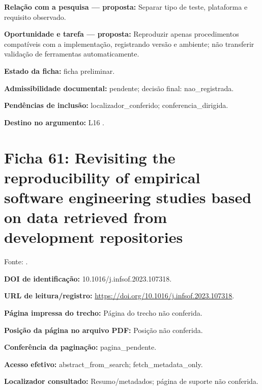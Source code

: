 \noindent\textbf{Relação com a pesquisa — proposta:} Separar tipo de teste, plataforma e requisito observado.\par\medskip

\noindent\textbf{Oportunidade e tarefa — proposta:} Reproduzir apenas procedimentos compatíveis com a implementação, registrando versão e ambiente; não transferir validação de ferramentas automaticamente.\par\medskip

\noindent\textbf{Estado da ficha:} ficha preliminar.\par\medskip

\noindent\textbf{Admissibilidade documental:} pendente; decisão final: nao\_registrada.\par\medskip

\noindent\textbf{Pendências de inclusão:} localizador\_conferido; conferencia\_dirigida.\par\medskip

\noindent\textbf{Destino no argumento:} L16 .

\clearpage\section*{Ficha 61: Revisiting the reproducibility of empirical software engineering studies based on data retrieved from development repositories}

Fonte: \citet{eng08}.

\noindent\textbf{DOI de identificação:} 10.1016/j.infsof.2023.107318.\par\medskip

\noindent\textbf{URL de leitura/registro:} \url{https://doi.org/10.1016/j.infsof.2023.107318}.\par\medskip

\noindent\textbf{Página impressa do trecho:} Página do trecho não conferida.\par\medskip

\noindent\textbf{Posição da página no arquivo PDF:} Posição não conferida.\par\medskip

\noindent\textbf{Conferência da paginação:} pagina\_pendente.\par\medskip

\noindent\textbf{Acesso efetivo:} abstract\_from\_search; fetch\_metadata\_only.\par\medskip

\noindent\textbf{Localizador consultado:} Resumo/metadados; página de suporte não conferida.\par\medskip

